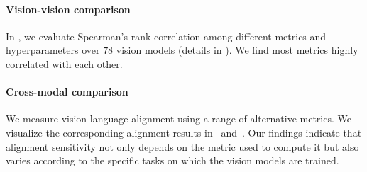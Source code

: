 \paragraph{Vision-vision comparison} 
In , we evaluate Spearman's rank correlation among different metrics and hyperparameters over $78$ vision models (details in ). We find most metrics highly correlated with each other.

\paragraph{Cross-modal comparison} We measure vision-language alignment using a range of alternative metrics.  We visualize the corresponding alignment results in~ and~. Our findings indicate that alignment sensitivity not only depends on the metric used to compute it but also varies according to the specific tasks on which the vision models are trained.

